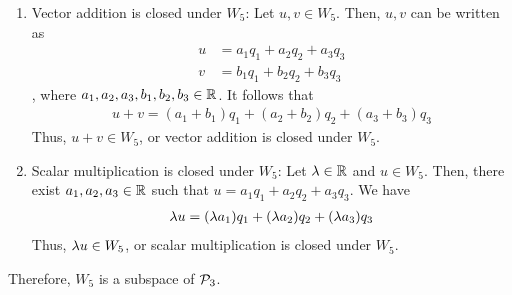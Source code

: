 \begin{sol}
\begin{enumerate}[(i)]
\begin{enumerate}[(1)]
            \item Vector addition is closed under $W_5$: Let $u,v\in W_5$. Then, $u,v$ can be written as
            \[
                \begin{aligned}
                    u &= a_1q_1+a_2q_2+a_3q_3 \\
                    v &= b_1q_1+b_2q_2+b_3q_3
                \end{aligned}
            \]
            , where $a_1,a_2,a_3,b_1,b_2,b_3\in\R$. It follows that
            \[
                \begin{aligned}
                    u+v=(a_1+b_1)q_1+(a_2+b_2)q_2+(a_3+b_3)q_3
                \end{aligned}
            \] 
            Thus, $u+v\in W_5$, or vector addition is closed under $W_5$.
            \item Scalar multiplication is closed under $W_5$: Let $\lam\in\R$ and $u\in W_5$. Then, there exist $a_1,a_2,a_3\in\R$ such that $u=a_1q_1+a_2q_2+a_3q_3$. We have
            \[
                \begin{aligned}
                    \lam u=(\lam a_1)q_1+(\lam a_2)q_2+(\lam a_3)q_3
                \end{aligned}
            \]
            Thus, $\lam u\in W_5$, or scalar multiplication is closed under $W_5$.
        \end{enumerate}
        Therefore, $W_5$ is a subspace of $\P_3$. 
    \end{enumerate}
\end{sol}